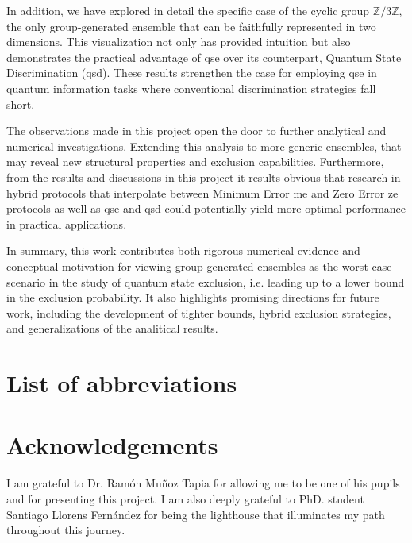 \documentclass[12pt,letterpaper]{article}
\begin{document}
In addition, we have explored in detail the specific case of the cyclic group $\mathbb{Z}/3\mathbb{Z}$, the only group-generated ensemble that can be faithfully represented in two dimensions. This visualization not only has provided intuition but also demonstrates the practical advantage of \gls{qse} over its counterpart, Quantum State Discrimination (\gls{qsd}). These results strengthen the case for employing \gls{qse} in quantum information tasks where conventional discrimination strategies fall short.

The observations made in this project open the door to further analytical and numerical investigations. Extending this analysis to more generic ensembles, that may reveal new structural properties and exclusion capabilities. Furthermore, from the results and discussions in this project it results obvious that research in hybrid protocols that interpolate between Minimum Error \gls{me} and Zero Error \gls{ze} protocols as well as \gls{qse} and \gls{qsd} could potentially yield more optimal performance in practical applications.

In summary, this work contributes both rigorous numerical evidence and conceptual motivation for viewing group-generated ensembles as the worst case scenario in the study of quantum state exclusion, i.e. leading up to a lower bound in the exclusion probability. It also highlights promising directions for future work, including the development of tighter bounds, hybrid exclusion strategies, and generalizations of the analitical results.

\newpage

 
\section*{List of abbreviations}
\renewcommand{\glsnamefont}[1]{\textbf{#1}}
\printnoidxglossary[type=main, title={\vspace{-1cm}}, nonumberlist, nogroupskip, style=super]

\section*{Acknowledgements}

\hspace{20pt}I am grateful to Dr. Ramón Muñoz Tapia for allowing me to be one of his pupils and for presenting this project. I am also deeply grateful to PhD. student Santiago Llorens Fernández for being the lighthouse that illuminates my path throughout this journey.
\end{document}
